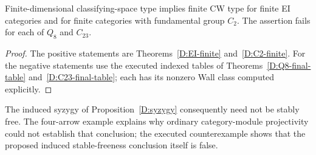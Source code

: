 






\begin{corollary}\label{D:D2-outcomes}
Finite-dimensional classifying-space type implies finite CW type for
finite EI categories and for finite categories with fundamental group
$C_2$. The assertion fails for each of $Q_8$ and $C_{23}$.
\end{corollary}
\begin{proof}
The positive statements are Theorems~\ref{D:EI-finite}
and~\ref{D:C2-finite}. For the negative statements use the executed
indexed tables of Theorems~\ref{D:Q8-final-table}
and~\ref{D:C23-final-table}; each has its nonzero Wall class
computed explicitly.
\end{proof}

The induced syzygy of Proposition~\ref{D:syzygy} consequently need
not be stably free. The four-arrow example explains why ordinary
category-module projectivity could not establish that conclusion;
the executed counterexample shows that the proposed induced
stable-freeness conclusion itself is false.



